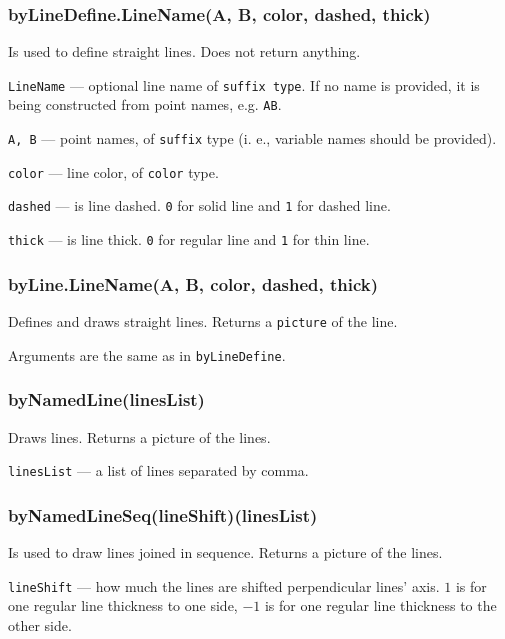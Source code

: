 \documentclass{ltxdoc}
\begin{document}

\subsubsection{byLineDefine.LineName(A, B, color, dashed, thick)}

	Is used to define straight lines. Does not return anything.
	
	\texttt{LineName} — optional line name of \texttt{suffix type}. If no name is provided, it is being constructed from point names, e.g. \texttt{AB}.
	
	\texttt{A, B} — point names, of \texttt{suffix} type (i. e., variable names should be provided).
	
	\texttt{color} — line color, of \texttt{color} type.
	
	\texttt{dashed} — is line dashed. \texttt{0} for solid line and \texttt{1} for dashed line.
	
	\texttt{thick} — is line thick. \texttt{0} for regular line and \texttt{1} for thin line.


\subsubsection{byLine.LineName(A, B, color, dashed, thick)}

	Defines and draws straight lines. Returns a \texttt{picture} of the line.
	
	Arguments are the same as in \texttt{byLineDefine}.


\subsubsection{byNamedLine(linesList)}

	Draws lines. Returns a picture of the lines.
	
	\texttt{linesList} — a list of lines separated by comma.

\subsubsection{byNamedLineSeq(lineShift)(linesList)}
	
	Is used to draw lines joined in sequence. Returns a picture of the lines.
	
	\texttt{lineShift} — how much the lines are shifted perpendicular lines' axis. \texttt{$1$} is for one regular line thickness to one side, \texttt{$-1$} is for one regular line thickness to the other side.
	
\end{document}
